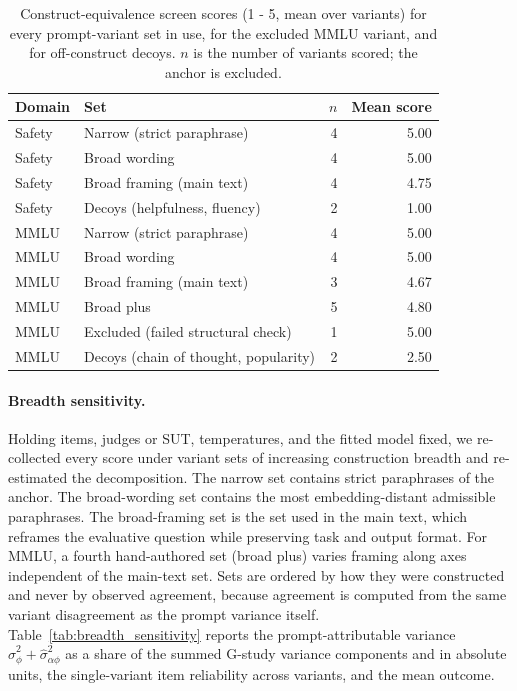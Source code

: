 \begin{table}[ht]
\centering
\small
\caption{Construct-equivalence screen scores (1 - 5, mean over variants) for every prompt-variant set in use, for the excluded MMLU variant, and for off-construct decoys. $n$ is the number of variants scored; the anchor is excluded.}
\label{tab:equiv_screen}
\begin{tabular}{llrr}
\toprule
\textbf{Domain} & \textbf{Set} & $n$ & \textbf{Mean score} \\
\midrule
Safety & Narrow (strict paraphrase)          & 4 & 5.00 \\
Safety & Broad wording                       & 4 & 5.00 \\
Safety & Broad framing (main text)           & 4 & 4.75 \\
Safety & Decoys (helpfulness, fluency)       & 2 & 1.00 \\
\midrule
MMLU   & Narrow (strict paraphrase)          & 4 & 5.00 \\
MMLU   & Broad wording                       & 4 & 5.00 \\
MMLU   & Broad framing (main text)           & 3 & 4.67 \\
MMLU   & Broad plus                          & 5 & 4.80 \\
MMLU   & Excluded (failed structural check)  & 1 & 5.00 \\
MMLU   & Decoys (chain of thought, popularity) & 2 & 2.50 \\
\bottomrule
\end{tabular}
\end{table}

\paragraph{Breadth sensitivity.} Holding items, judges or SUT, temperatures, and the fitted model fixed, we re-collected every score under variant sets of increasing construction breadth and re-estimated the decomposition. The narrow set contains strict paraphrases of the anchor. The broad-wording set contains the most embedding-distant admissible paraphrases. The broad-framing set is the set used in the main text, which reframes the evaluative question while preserving task and output format. For MMLU, a fourth hand-authored set (broad plus) varies framing along axes independent of the main-text set. Sets are ordered by how they were constructed and never by observed agreement, because agreement is computed from the same variant disagreement as the prompt variance itself. Table~\ref{tab:breadth_sensitivity} reports the prompt-attributable variance $\hat\sigma^2_\phi + \hat\sigma^2_{\alpha\phi}$ as a share of the summed G-study variance components and in absolute units, the single-variant item reliability across variants, and the mean outcome.

